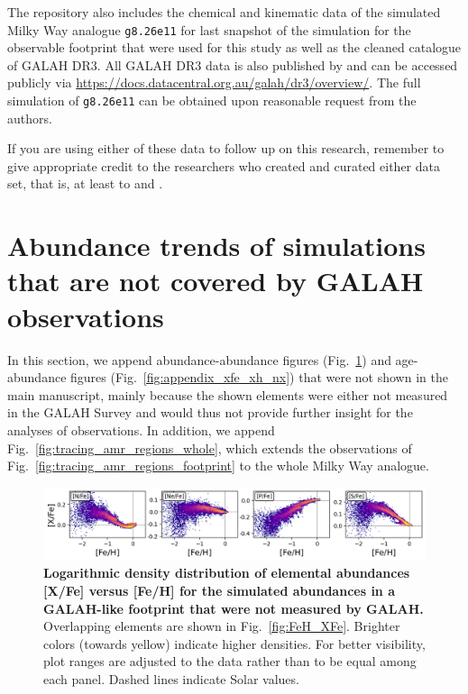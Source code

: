 \documentclass[fleqn,usenatbib]{mnras}
\begin{document}
The repository also includes the chemical and kinematic data of the simulated Milky Way analogue \texttt{g8.26e11} for last snapshot of the simulation for the observable footprint that were used for this study as well as the cleaned catalogue of GALAH DR3. All GALAH DR3 data is also published by \citet{Buder2021} and can be accessed publicly via \url{https://docs.datacentral.org.au/galah/dr3/overview/}. The full simulation of \texttt{g8.26e11} can be obtained upon reasonable request from the authors.

If you are using either of these data to follow up on this research, remember to give appropriate credit to the researchers who created and curated either data set, that is, at least to \citet{Buder2021, Buder2022} and \citet{Buck2020b, Buck2021}.





\appendix

\section{Abundance trends of simulations that are not covered by GALAH observations} \label{sec:appendix_other_abundances}

In this section, we append abundance-abundance figures (Fig.~\ref{fig:appendix_feh_xfe_nneps}) and age-abundance figures (Fig.~\ref{fig:appendix_xfe_xh_nx}) that were not shown in the main manuscript, mainly because the shown elements were either not measured in the GALAH Survey and would thus not provide further insight for the analyses of observations. In addition, we append Fig.~\ref{fig:tracing_amr_regions_whole}, which extends the observations of Fig.~\ref{fig:tracing_amr_regions_footprint} to the whole Milky Way analogue.

\begin{figure}
	\includegraphics[width=\textwidth]{figures/Overview_FeH_XFe_Sim_only.png}
    \caption{
    \textbf{Logarithmic density distribution of elemental abundances [X/Fe] versus [Fe/H] for the simulated abundances in a GALAH-like footprint that were not measured by GALAH.
    }
    Overlapping elements are shown in Fig.~\ref{fig:FeH_XFe}. Brighter colors (towards yellow) indicate higher densities. For better visibility, plot ranges are adjusted to the data rather than to be equal among each panel. Dashed lines indicate Solar values.
    }
    \label{fig:appendix_feh_xfe_nneps}
\end{figure}
\end{document}
